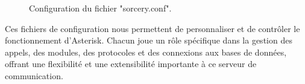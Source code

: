 \begin{itemize}
   \begin{figure}[H]
        \centering
        \caption{Configuration du fichier "sorcery.conf".}
        \label{fig:sorcery}
    \end{figure}
\end{itemize}
Ces fichiers de configuration nous permettent de personnaliser et de contrôler le fonctionnement d’Asterisk. Chacun joue un rôle spécifique dans la gestion des appels, des modules, des protocoles et des connexions aux bases de données, offrant une flexibilité et une extensibilité importante à ce serveur de communication.

